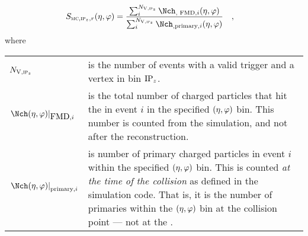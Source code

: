 \begin{align}
  \label{eq:secondary}
  \SecMap{} &=
  \frac{\sum_i^{\NV[,\subIPz]}\mult[,\text{\FMD{}},i]\etaphi}{
    \sum_i^{\NV[,\subIPz]}\mult[,\text{primary},i]\etaphi}\quad,
\end{align}
where 


\begin{tabular}[T]{p{.18\linewidth}p{.78\linewidth}}
  $\NV[,\subIPz]$ & is the number of events with a valid trigger
                    and a vertex in bin $\IPz$.\\ 
  $\dndetadphi[\FMD{},i]$ & is the total number of charged
                            particles that hit the \FMD{} in event $i$
                            in the specified $\etaphi$ bin.  This
                            number is counted from the simulation, and
                            not  after the
                            reconstruction\footnotemark.\\  
  $\dndetadphi[\text{primary},i]$ & is number of primary charged
                                    particles in event $i$ within the
                                    specified $\etaphi$ bin.  This is
                                    counted \emph{at the time of the
                                    collision} as defined in the
                                    simulation code.  That is, it is
                                    the number of primaries within the
                                    $\etaphi$ bin at the collision
                                    point --- not at the \FMD{}. 
\end{tabular}
\iffalse
\begin{description}
\item[] $\NV[,\subIPz]$ is the number of events with a valid trigger
  and a vertex in bin $\IPz$.
\item[] $\dndetadphi[\FMD{},i]$ is the total number of charged
  particles that hit the \FMD{} in event $i$ in the specified
  $\etaphi$ bin.  This number is counted from the simulation, and not
  after the reconstruction\footnote{Technically, we are counting
    `track references' within the $\etaphi$ bin for a given
    sub-detector.}.
\item[] $\dndetadphi[\text{primary},i]$ is number of primary charged
  particles in event $i$ within the specified $\etaphi$ bin.  This is
  counted \emph{at the time of the collision} as defined in the
  simulation code.  That is, it is the number of primaries within the
  $\etaphi$ bin at the collision point --- not at the \FMD{}.
\end{description}
\fi


